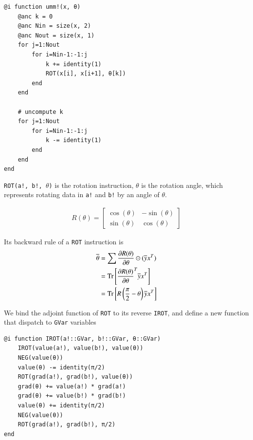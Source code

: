 \documentclass[aps,twocolumn,longbibliography,english,superscriptaddress,prr]{revtex4-1}
\newcommand{\<}{\langle}
\renewcommand{\>}{\rangle}
\newcommand{\Tr}{{\rm Tr}}
\theoremstyle{definition}\newtheorem{definition}{\textit{Definition}}
\begin{document}
\begin{minipage}{.44\textwidth}
\begin{lstlisting}
@i function umm!(x, θ)
    @anc k = 0
    @anc Nin = size(x, 2)
    @anc Nout = size(x, 1)
    for j=1:Nout
        for i=Nin-1:-1:j
            k += identity(1)
            ROT(x[i], x[i+1], θ[k])
        end
    end

    # uncompute k
    for j=1:Nout
        for i=Nin-1:-1:j
            k -= identity(1)
        end
    end
end
\end{lstlisting}
\end{minipage}

\texttt{ROT(a!, b!, $\theta$)} is the rotation instruction, \texttt{$\theta$} is the rotation angle, which represents rotating data in \texttt{a!} and \texttt{b!} by an angle of $\theta$.

\begin{align}
    R(\theta)  = \begin{bmatrix}
        \cos(\theta) & - \sin(\theta)\\
        \sin(\theta)  & \cos(\theta)
    \end{bmatrix}
\end{align}


Its backward rule of a \texttt{ROT} instruction is
\begin{align}
    \begin{split}
    \overline{\theta}  &= \sum\frac{\partial R(\theta)}{\partial \theta}\odot(\overline{y}x^T)\\
    &= \Tr\left[\frac{\partial R(\theta)}{\partial \theta}^T\overline{y}x^T\right]\\
    &= \Tr\left[R\left(\frac{\pi}{2}-\theta\right)\overline{y}x^T\right]
    \end{split}
\end{align}

We bind the adjoint function of \texttt{ROT} to its reverse \texttt{IROT},
and define a new function that dispatch to \texttt{GVar} variables

\begin{minipage}{.44\textwidth}
\begin{lstlisting}
@i function IROT(a!::GVar, b!::GVar, θ::GVar)
    IROT(value(a!), value(b!), value(θ))
    NEG(value(θ))
    value(θ) -= identity(π/2)
    ROT(grad(a!), grad(b!), value(θ))
    grad(θ) += value(a!) * grad(a!)
    grad(θ) += value(b!) * grad(b!)
    value(θ) += identity(π/2)
    NEG(value(θ))
    ROT(grad(a!), grad(b!), π/2)
end
\end{lstlisting}
\end{minipage}
\end{document}
